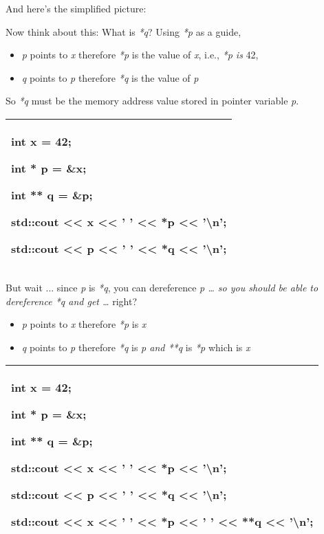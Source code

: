 \documentclass[
]{article}
\providecommand{\tightlist}{%
  \setlength{\itemsep}{0pt}\setlength{\parskip}{0pt}}
\begin{document}
And here's the simplified picture:

Now think about this: What is \emph{*q}? Using \emph{*p} as a guide,

\begin{itemize}
\tightlist
\item
  \emph{p} points to \emph{x} therefore \emph{*p} is the value of
  \emph{x}, i.e., \emph{*p is }42,
\item
  \emph{q} points to \emph{p} therefore \emph{*q} is the value of
  \emph{p}
\end{itemize}

So \emph{*q} must be the memory address value stored in pointer variable
\emph{p}.

\begin{longtable}[]{@{}l@{}}
\toprule
\endhead
\begin{minipage}[t]{0.97\columnwidth}\raggedright
int x = 42;

int * p = \&x;

int ** q = \&p;

std::cout \textless\textless{} x \textless\textless{} ' '
\textless\textless{} *p \textless\textless{} '\textbackslash n';

std::cout \textless\textless{} p \textless\textless{} ' '
\textless\textless{} *q \textless\textless{} '\textbackslash n';\strut
\end{minipage}\tabularnewline
\bottomrule
\end{longtable}

But wait ... since \emph{p} is \emph{*q}, you can dereference \emph{p
\ldots{} so you should be able to dereference *q and get \ldots{}
}right?\textbf{ }

\begin{itemize}
\tightlist
\item
  \emph{p} points to \emph{x} therefore \emph{*p} is \emph{x}
\item
  \emph{q} points to \emph{p} therefore \emph{*q} is \emph{p and **q} is
  \emph{*p} which is \emph{x}
\end{itemize}

\begin{longtable}[]{@{}l@{}}
\toprule
\endhead
\begin{minipage}[t]{0.97\columnwidth}\raggedright
int x = 42;

int * p = \&x;

int ** q = \&p;

std::cout \textless\textless{} x \textless\textless{} ' '
\textless\textless{} *p \textless\textless{} '\textbackslash n';

std::cout \textless\textless{} p \textless\textless{} ' '
\textless\textless{} *q \textless\textless{} '\textbackslash n';

std::cout \textless\textless{} x \textless\textless{} ' '
\textless\textless{} *p \textless\textless{} ' ' \textless\textless{}
**q \textless\textless{} '\textbackslash n';\strut
\end{minipage}\tabularnewline
\bottomrule
\end{longtable}
\end{document}
